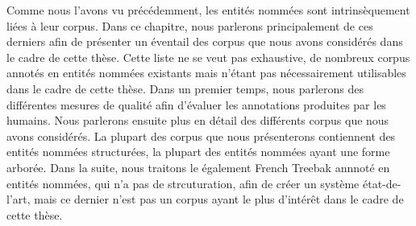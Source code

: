 \documentclass[PhD-Yoann-Dupont.tex]{subfiles}
\begin{document}
Comme nous l'avons vu précédemment, les entités nommées sont intrinsèquement liées à leur corpus. Dans ce chapitre, nous parlerons principalement de ces derniers afin de présenter un éventail des corpus que nous avons considérés dans le cadre de cette thèse. Cette liste ne se veut pas exhaustive, de nombreux corpus annotés en entités nommées existants mais n'étant pas nécessairement utilisables dans le cadre de cette thèse. Dans un premier temps, nous parlerons des différentes mesures de qualité afin d'évaluer les annotations produites par les humains. Nous parlerons ensuite plus en détail des différents corpus que nous avons considérés. La plupart des corpus que nous présenterons contiennent des entités nommées structurées, la plupart des entités nommées ayant une forme arborée. Dans la suite, nous traitons le également French Treebak annnoté en entités nommées, qui n'a pas de strcuturation, afin de créer un système état-de-l'art, mais ce dernier n'est pas un corpus ayant le plus d'intérêt dans le cadre de cette thèse.
\end{document}
